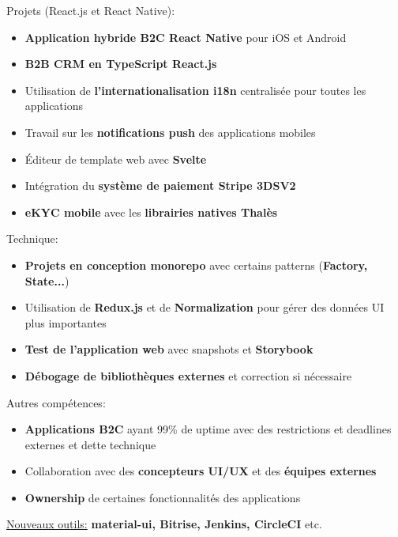 \documentclass[10pt,a4paper,ragged2e,withhyper]{altacv}
\begin{document}
\vspace{-.5\baselineskip}
\begin{minipage}[t]{0.45\textwidth}
  \vspace{0pt}
  Projets (React.js et React Native):
  \begin{itemize}
    \item \textbf{Application hybride B2C React Native} pour iOS et Android
    \item \textbf{B2B CRM en TypeScript React.js}
    \item Utilisation de \textbf{l'internationalisation i18n} centralisée pour toutes les applications
    \item Travail sur les \textbf{notifications push} des applications mobiles
    \item Éditeur de template web avec \textbf{Svelte}
    \item Intégration du \textbf{système de paiement Stripe 3DSV2}
    \item \textbf{eKYC mobile} avec les \textbf{librairies natives Thalès}
  \end{itemize}
\end{minipage}
\hfill
\begin{minipage}[t]{0.45\textwidth}
  \vspace{0pt}
  Technique:
  \begin{itemize}
    \item \textbf{Projets en conception monorepo} avec certains patterns (\textbf{Factory, State...})
    \item Utilisation de \textbf{Redux.js} et de \textbf{Normalization} pour gérer des données UI plus importantes
    \item \textbf{Test de l'application web} avec snapshots et \textbf{Storybook}
    \item \textbf{Débogage de bibliothèques externes} et correction si nécessaire
  \end{itemize}
\end{minipage}

\bigskip
Autres compétences:
\begin{itemize}
  \item \textbf{Applications B2C} ayant 99\% de uptime avec des restrictions et deadlines externes et dette technique
  \item Collaboration avec des \textbf{concepteurs UI/UX} et des \textbf{équipes externes}
  \item \textbf{Ownership} de certaines fonctionnalités des applications
\end{itemize}
\begin{itshape}
  \underline{Nouveaux outils:}
  \small{\textbf{material-ui, Bitrise, Jenkins, CircleCI} etc.}
\end{itshape}
\end{document}

